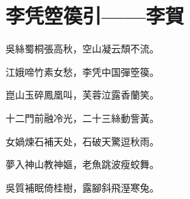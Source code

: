 \section{李凭箜篌引——李賀}
吳絲蜀桐張高秋，空山凝云頹不流。

江娥啼竹素女愁，李凭中国彈箜篌。

崑山玉碎鳳凰叫，芙蓉泣露香蘭笑。

十二門前融冷光，二十三絲動訾黃。

女媧煉石補天处，石破天驚逗秋雨。

夢入神山教神嫗，老魚跳波瘦蛟舞。

吳質補眠倚桂樹，露腳斜飛溼寒兔。